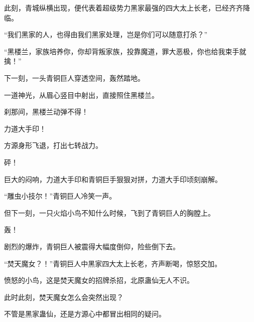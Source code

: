 \begin{this_body}
此刻，青城纵横出现，便代表着超级势力黑家最强的四大太上长老，已经齐齐降临。

“我们黑家的人，也得由我们黑家处理，岂是你们可以随意打杀？”

“黑楼兰，家族培养你，你却背叛家族，投靠魔道，罪大恶极，你也给我束手就擒！”

下一刻，一头青铜巨人穿透空间，轰然踏地。

一道神光，从眉心竖目中射出，直接照住黑楼兰。

刹那间，黑楼兰动弹不得！

力道大手印！

方源身形飞退，打出七转战力。

砰！

巨大的闷响，力道大手印和青铜巨手狠狠对拼，力道大手印顷刻崩解。

“雕虫小技尔！”青铜巨人冷笑一声。

但下一刻，一只火焰小鸟不知什么时候，飞到了青铜巨人的胸膛上。

轰！

剧烈的爆炸，青铜巨人被震得大幅度倒仰，险些倒下去。

“焚天魔女？！”青铜巨人中黑家四大太上长老，齐声断喝，惊怒交加。

愤怒的小鸟，这是焚天魔女的招牌杀招，北原蛊仙无人不识。

此时此刻，焚天魔女怎么会突然出现？

不管是黑家蛊仙，还是方源心中都冒出相同的疑问。

\end{this_body}


